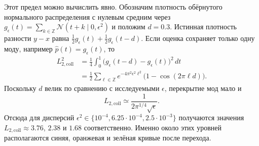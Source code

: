Этот предел можно вычислить явно. Обозначим плотность обёрнутого нормального распределения
с нулевым средним через
$g_\epsilon(t)=\sum_{k\in\mathbb{Z}}\mathcal{N}(t+k\mid0,\epsilon^2)$ и положим
$d=0.3$. Истинная плотность разности $y-x$ равна
$\tfrac12 g_\epsilon(t)+\tfrac12 g_\epsilon(t-d)$. Если оценка сохраняет только одну моду,
например $\widehat p(t)=g_\epsilon(t)$, то
\begin{align}
L_{2,\mathrm{coll}}^2
&=\frac14\int_0^1\bigl(g_\epsilon(t-d)-g_\epsilon(t)\bigr)^2\,dt \\
&=\frac12\sum_{\ell\in\mathbb{Z}}
e^{-4\pi^2\epsilon^2\ell^2}\bigl(1-\cos(2\pi\ell d)\bigr).
\label{eq:collapsed-mixture-l2}
\end{align}
Поскольку $d$ велик по сравнению с исследуемыми $\epsilon$, перекрытие мод мало и
\begin{equation}
L_{2,\mathrm{coll}}
\simeq \frac{1}{2\pi^{1/4}\sqrt{\epsilon}}.
\label{eq:collapsed-mixture-l2-approx}
\end{equation}
Отсюда для дисперсий $\epsilon^2\in\{10^{-4},6.25\cdot10^{-4},2.5\cdot10^{-3}\}$
получаются значения $L_{2,\mathrm{coll}}\approx3.76$, $2.38$ и $1.68$ соответственно.
Именно около этих уровней располагаются синяя, оранжевая и зелёная кривые после перехода.
